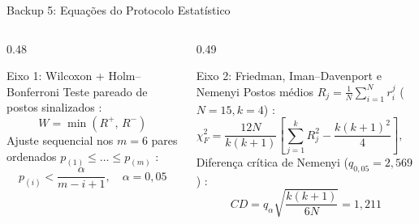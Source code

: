 \begin{frame}{Backup 5: Equações do Protocolo Estatístico \autocite{demsar2006statistical}}
  \begin{columns}[T,onlytextwidth]
    \begin{column}{0.48\textwidth}
      \begin{block}{Eixo 1: Wilcoxon + Holm--Bonferroni}
        Teste pareado de postos sinalizados \autocite{wilcoxon1945individual}:
        \[
          W = \min(R^+,\, R^-)
        \]
        Ajuste sequencial nos $m = 6$ pares ordenados $p_{(1)} \le \dots \le p_{(m)}$ \autocite{holm1979simple}:
        \[
          p_{(i)} < \frac{\alpha}{m - i + 1}, \quad \alpha = 0{,}05
        \]
      \end{block}
    \end{column}
    \begin{column}{0.49\textwidth}
      \begin{block}{Eixo 2: Friedman, Iman--Davenport e Nemenyi}
        Postos médios $R_j = \frac{1}{N}\sum_{i=1}^{N} r_i^j$ ($N = 15, k = 4$) \autocite{friedman1937use}:
        \[
          \chi_F^2 = \frac{12N}{k(k+1)}\!\left[\sum_{j=1}^k R_j^2 - \frac{k(k+1)^2}{4}\right], \quad
          F_F = \frac{(N-1)\chi_F^2}{N(k-1)-\chi_F^2}
        \]
        Diferença crítica de Nemenyi ($q_{0{,}05}=2{,}569$) \autocite{nemenyi1963distribution}:
        \[
          CD = q_{\alpha}\sqrt{\frac{k(k+1)}{6N}} = 1{,}211
        \]
      \end{block}
    \end{column}
  \end{columns}
\end{frame}

